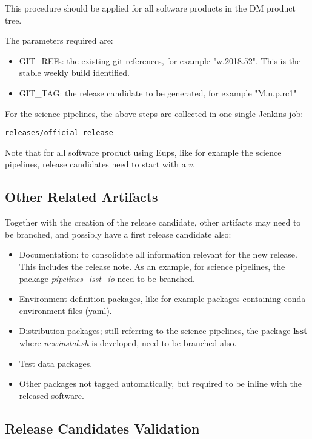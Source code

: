 This procedure should be applied for all software products in the DM product tree.

The parameters required are:
\begin{itemize}
\item GIT\_REFs: the existing git references, for example "w.2018.52". This is the stable weekly build identified.
\item GIT\_TAG: the release candidate to be generated, for example "M.n.p.rc1"
\end{itemize}

For the science pipelines, the above steps are collected in one single Jenkins job:
 
\begin{verbatim}
releases/official-release
\end{verbatim}

Note that for all software product using Eups, like for example the science pipelines, release candidates need to start with a $v$.

\subsection{Other Related Artifacts}

Together with the creation of the release candidate, other artifacts may need to be branched, and possibly have a first release candidate also:

\begin{itemize}
\item Documentation: to consolidate all information relevant for the new release. This includes the release note. 
As an example, for science pipelines, the package \textit{pipelines\_lsst\_io} need to be branched.
\item  Environment definition packages, like for example packages containing conda environment files (yaml).
\item  Distribution packages; still referring to the science pipelines, the package \textbf{lsst}  where \textit{newinstal.sh} is developed, need to be branched also.
\item Test data packages.
\item Other packages not tagged automatically, but required to be inline with the released software.
\end{itemize}


\subsection{Release Candidates Validation} \label{sec:rcvalidation}

